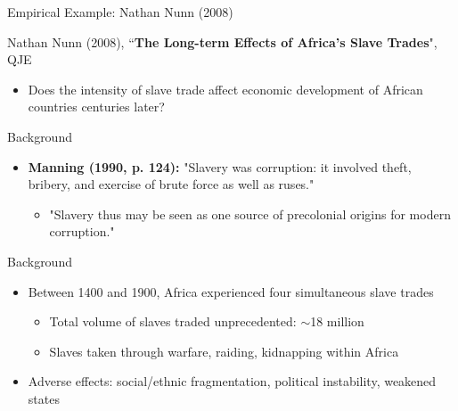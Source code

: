 \documentclass[hyperref={pdfpagelabels=false}]{beamer}
\begin{document}





\date
{}


\begin{frame}{}
\titlepage
\end{frame}



\begin{frame}{Empirical Example: Nathan Nunn (2008)}

Nathan Nunn (2008), ``\textbf{The Long-term Effects of Africa's Slave Trades}", QJE
					\vspace{0.2cm}
\begin{itemize}
	\item Does the intensity of slave trade affect economic development of African countries centuries later?
\end{itemize}
\end{frame}



	


\begin{frame}{Background}
\begin{itemize}
	\item \textbf{Manning (1990, p. 124):} "Slavery was corruption: it involved theft, bribery, and exercise of brute force as well as ruses."
					\vspace{0.2cm}
					\begin{itemize}
	\item "Slavery thus may be seen as one source of precolonial origins
	for modern corruption."
\end{itemize}
\end{itemize}
\end{frame}


\begin{frame}{Background}
\begin{itemize}
	\item Between 1400 and 1900, Africa experienced four simultaneous slave trades
						\vspace{0.2cm}
									\begin{itemize}		
	\item Total volume of slaves traded unprecedented: $\sim$18 million
						\vspace{0.2cm}
	\item Slaves taken through warfare, raiding, kidnapping within Africa
						\vspace{0.2cm}
	\end{itemize}				
	\item Adverse effects: social/ethnic fragmentation, political instability, weakened states
\end{itemize}
\end{frame}
\end{document}
